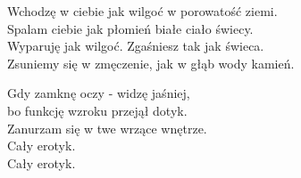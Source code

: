 \begin{text}
    Wchodzę w ciebie jak wilgoć w porowatość ziemi.\\
    Spalam ciebie jak płomień białe ciało świecy.\\
    Wyparuję jak wilgoć. Zgaśniesz tak jak świeca.\\
    Zsuniemy się w zmęczenie, jak w głąb wody kamień.

    Gdy zamknę oczy - widzę jaśniej,\\
    bo funkcję wzroku przejął dotyk.\\
    Zanurzam się w twe wrzące wnętrze.\\
    Cały erotyk.\\
    Cały erotyk.
\end{text}
\begin{chord}

\end{chord}